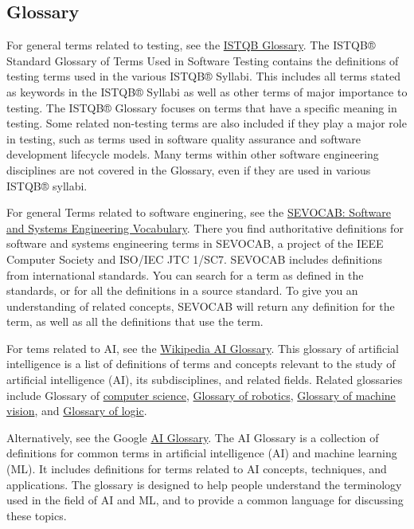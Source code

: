 \documentclass[
  letterpaper,
  DIV=11,
  numbers=noendperiod,
  oneside]{scrreprt}
\begin{document}
\begin{tcolorbox}
\chapter{Glossary}\label{glossary}

For general terms related to testing, see the
\href{https://glossary.istqb.org/en_US/search?term=&attributes=\%5B\%22name\%22\%2C\%22abbreviation\%22\%2C\%22synonyms\%22\%5D&exact_matches_first=true&second_language=de_DE}{ISTQB
Glossary}. The ISTQB® Standard Glossary of Terms Used in Software
Testing contains the definitions of testing terms used in the various
ISTQB® Syllabi. This includes all terms stated as keywords in the ISTQB®
Syllabi as well as other terms of major importance to testing. The
ISTQB® Glossary focuses on terms that have a specific meaning in
testing. Some related non-testing terms are also included if they play a
major role in testing, such as terms used in software quality assurance
and software development lifecycle models. Many terms within other
software engineering disciplines are not covered in the Glossary, even
if they are used in various ISTQB® syllabi.

For general Terms related to software enginering, see the
\href{https://pascal.computer.org/sev_display/index.action}{SEVOCAB:
Software and Systems Engineering Vocabulary}. There you find
authoritative definitions for software and systems engineering terms in
SEVOCAB, a project of the IEEE Computer Society and ISO/IEC JTC 1/SC7.
SEVOCAB includes definitions from international standards. You can
search for a term as defined in the standards, or for all the
definitions in a source standard. To give you an understanding of
related concepts, SEVOCAB will return any definition for the term, as
well as all the definitions that use the term.

For tems related to AI, see the
\href{https://en.wikipedia.org/wiki/Glossary_of_artificial_intelligence}{Wikipedia
AI Glossary}. This glossary of artificial intelligence is a list of
definitions of terms and concepts relevant to the study of artificial
intelligence (AI), its subdisciplines, and related fields. Related
glossaries include Glossary of \href{}{computer science},
\href{https://en.wikipedia.org/wiki/Glossary_of_robotics}{Glossary of
robotics},
\href{https://en.wikipedia.org/wiki/Glossary_of_machine_vision}{Glossary
of machine vision}, and
\href{https://en.wikipedia.org/wiki/Glossary_of_logic}{Glossary of
logic}.

Alternatively, see the Google
\href{https://ai.google.dev/learn/glossary}{AI Glossary}. The AI
Glossary is a collection of definitions for common terms in artificial
intelligence (AI) and machine learning (ML). It includes definitions for
terms related to AI concepts, techniques, and applications. The glossary
is designed to help people understand the terminology used in the field
of AI and ML, and to provide a common language for discussing these
topics.


\end{tcolorbox}
\end{document}
